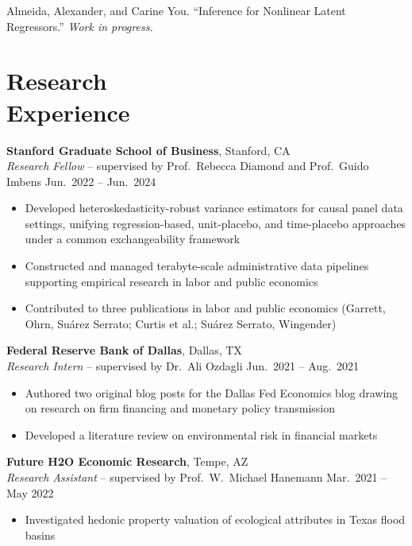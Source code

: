 \documentclass[line, margin, 10pt]{res}
\begin{document}
\begin{resume}
\vspace{2pt}

Almeida, Alexander, and Carine You.
``Inference for Nonlinear Latent Regressors.''
\textit{Work in progress.}

\section{\sc Research\\ Experience}

\textbf{Stanford Graduate School of Business}, Stanford, CA \\
\textit{Research Fellow} -- supervised by Prof.\ Rebecca Diamond and Prof.\ Guido Imbens
\hfill Jun.\ 2022 -- Jun.\ 2024
\begin{itemize}
  \item Developed heteroskedasticity-robust variance estimators for causal panel
        data settings, unifying regression-based, unit-placebo, and time-placebo
        approaches under a common exchangeability framework
  \item Constructed and managed terabyte-scale administrative data pipelines
        supporting empirical research in labor and public economics
  \item Contributed to three publications in labor and public economics (Garrett, Ohrn, Su\'{a}rez Serrato; Curtis et al.; Su\'{a}rez Serrato, Wingender)
\end{itemize}

\vspace{4pt}

\textbf{Federal Reserve Bank of Dallas}, Dallas, TX \\
\textit{Research Intern} -- supervised by Dr.\ Ali Ozdagli
\hfill Jun.\ 2021 -- Aug.\ 2021
\begin{itemize}
  \item Authored two original blog posts for the Dallas Fed Economics blog drawing
        on research on firm financing and monetary policy transmission
  \item Developed a literature review on environmental risk in financial markets
\end{itemize}

\vspace{4pt}

\textbf{Future H2O Economic Research}, Tempe, AZ \\
\textit{Research Assistant} -- supervised by Prof.\ W.\ Michael Hanemann
\hfill Mar.\ 2021 -- May 2022
\begin{itemize}
  \item Investigated hedonic property valuation of ecological attributes in Texas
        flood basins
\end{itemize}


\end{resume}
\end{document}
